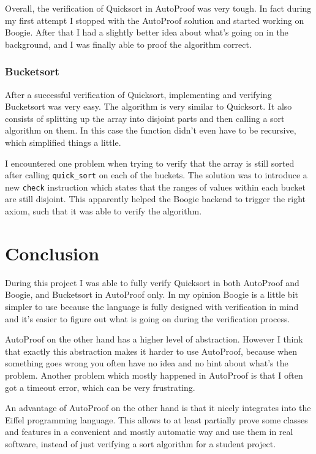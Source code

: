 \documentclass[a4paper,10pt]{article}
\begin{document}
Overall, the verification of Quicksort in AutoProof was very tough.
In fact during my first attempt I stopped with the AutoProof solution and started working on Boogie.
After that I had a slightly better idea about what's going on in the background, and I was finally able to proof the algorithm correct.

\subsubsection{Bucketsort}

After a successful verification of Quicksort, implementing and verifying Bucketsort was very easy.
The algorithm is very similar to Quicksort.
It also consists of splitting up the array into disjoint parts and then calling a sort algorithm on them.
In this case the function didn't even have to be recursive, which simplified things a little.

I encountered one problem when trying to verify that the array is still sorted after calling \lstinline!quick_sort! on each of the buckets.
The solution was to introduce a new \lstinline!check! instruction which states that the ranges of values within each bucket are still disjoint.
This apparently helped the Boogie backend to trigger the right axiom, such that it was able to verify the algorithm.

\section {Conclusion}

During this project I was able to fully verify Quicksort in both AutoProof and Boogie, and Bucketsort in AutoProof only.
In my opinion Boogie is a little bit simpler to use because the language is fully designed with verification in mind
and it's easier to figure out what is going on during the verification process.

AutoProof on the other hand has a higher level of abstraction.
However I think that exactly this abstraction makes it harder to use AutoProof, 
because when something goes wrong you often have no idea and no hint about what's the problem.
Another problem which mostly happened in AutoProof is that I often got a timeout error, which can be very frustrating.

An advantage of AutoProof on the other hand is that it nicely integrates into the Eiffel programming language.
This allows to at least partially prove some classes and features in a convenient and mostly automatic way
and use them in real software, instead of just verifying a sort algorithm for a student project.
\end{document}
